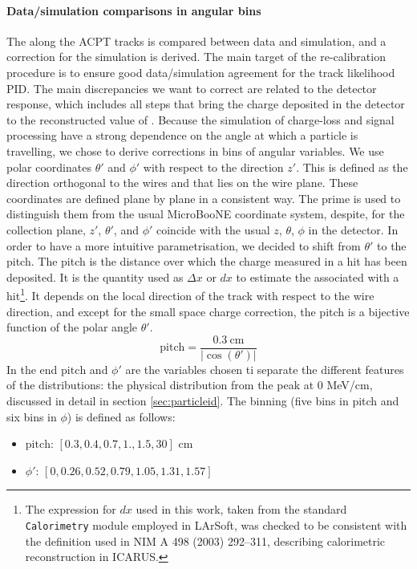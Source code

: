 \paragraph{Data/simulation comparisons in angular bins}
The \dqdx along the ACPT tracks is compared between data and simulation, and a correction for the simulation is derived.
The main target of the re-calibration procedure is to ensure good data/simulation agreement for the track likelihood PID.
The main discrepancies we want to correct are related to the detector response, which includes all steps that bring the charge deposited in the detector to the reconstructed value of \dqdx.
Because the simulation of charge-loss and signal processing have a strong dependence on the angle at which a particle is travelling, we chose to derive corrections in bins of angular variables.
We use polar coordinates $\theta'$ and $\phi'$ with respect to the direction $z'$.
This is defined as the direction orthogonal to the wires and that lies on the wire plane.
These coordinates are defined plane by plane in a consistent way.
The prime is used to distinguish them from the usual MicroBooNE coordinate system, despite, for the collection plane, $z'$, $\theta'$, and $\phi'$ coincide with the usual $z$, $\theta$, $\phi$ in the detector.
In order to have a more intuitive parametrisation, we decided to shift from $\theta'$ to the pitch.
The pitch is the distance over which the charge measured in a hit has been deposited.
It is the quantity used as $\Delta x$ or $dx$ to estimate the \dedx associated with a hit\footnote{The expression for $dx$ used in this work, taken from the standard \texttt{Calorimetry} module employed in LArSoft, was checked to be consistent with the definition used in NIM A 498 (2003) 292–311, describing calorimetric reconstruction in ICARUS.}.
It depends on the local direction of the track with respect to the wire direction, and except for the small space charge correction, the pitch is a bijective function of the polar angle $\theta'$.
\[ \text{pitch} = \frac{0.3~\text{cm}}{|\cos(\theta')|} \]
In the end $\text{pitch}$ and $\phi'$ are the variables chosen ti separate the different features of the \dedx distributions: the physical \dedx distribution from the peak at 0 MeV/cm, discussed in detail in section \ref{sec:particleid}.
The binning (five bins in pitch and six bins in $\phi$) is defined as follows:
\begin{itemize}
    \item $\text{pitch}$: $[0.3, 0.4, 0.7, 1., 1.5, 30]$ cm
    \item $\phi'$: $[0, 0.26, 0.52, 0.79, 1.05, 1.31, 1.57]$
\end{itemize}

